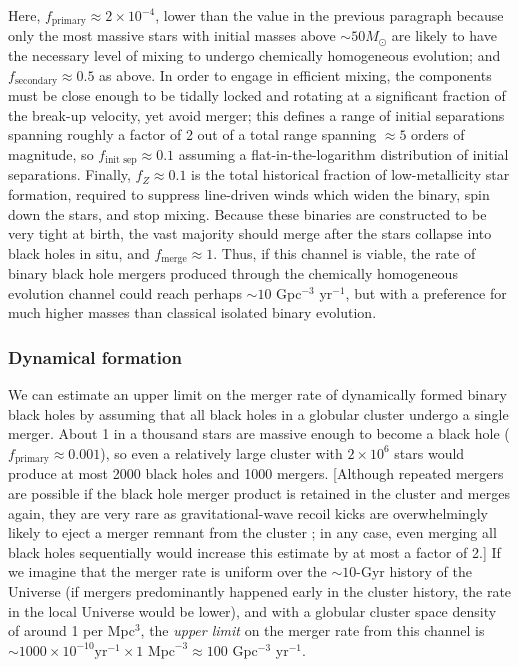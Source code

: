 \documentclass[review]{elsarticle}
\begin{document}
Here, $f_\textrm{primary} \approx 2 \times 10^{-4}$, lower than the value in the previous paragraph because only the most massive stars with initial masses above $\sim 50 M_\odot$ are likely to have the necessary level of mixing to undergo chemically homogeneous evolution; and $f_\textrm{secondary} \approx 0.5$ as above.  In order to engage in efficient mixing, the components must be close enough to be tidally locked and rotating at a significant fraction of the break-up velocity, yet avoid merger; this defines a range of initial separations spanning roughly a factor of 2 out of a total range spanning $\approx 5$ orders of magnitude, so $f_\textrm{init sep} \approx 0.1$ assuming a flat-in-the-logarithm distribution of initial separations.  Finally, $f_Z \approx 0.1$ is the total historical fraction of low-metallicity star formation, required to suppress line-driven winds which widen the binary, spin down the stars, and stop mixing.  Because these binaries are constructed to be very tight at birth, the vast majority should merge after the stars collapse into black holes in situ, and $f_\textrm{merge} \approx 1$. Thus, if this channel is viable, the rate of binary black hole mergers produced through the chemically homogeneous evolution channel could reach perhaps $\sim 10$ Gpc$^{-3}$ yr$^{-1}$, but with a preference for much higher masses than classical isolated binary evolution.


\subsubsection{Dynamical formation}

We can estimate an upper limit on the merger rate of dynamically formed binary black holes by assuming that all black holes in a globular cluster undergo a single merger.  About 1 in a thousand stars are massive enough to become a black hole ($f_\textrm{primary} \approx 0.001$), so even a relatively large cluster with $2\times 10^6$ stars would produce at most 2000 black holes and 1000 mergers.  [Although repeated mergers are possible if the black hole merger product is retained in the cluster and merges again, they are very rare as gravitational-wave recoil kicks are overwhelmingly likely to eject a merger remnant from the cluster \citep{Rodriguez:2018}; in any case, even merging all black holes sequentially would increase this estimate by at most a factor of 2.]  If we imagine that the merger rate is uniform over the $\sim 10$-Gyr history of the Universe (if mergers predominantly happened early in the cluster history, the rate in the local Universe would be lower), and with a globular cluster space density of around 1 per Mpc$^3$, the {\it upper limit} on the merger rate from this channel is $\sim 1000 \times 10^{-10} \textrm{yr}^{-1} \times 1 \textrm{ Mpc}^{-3} \approx 100$ Gpc$^{-3}$ yr$^{-1}$.
\end{document}
